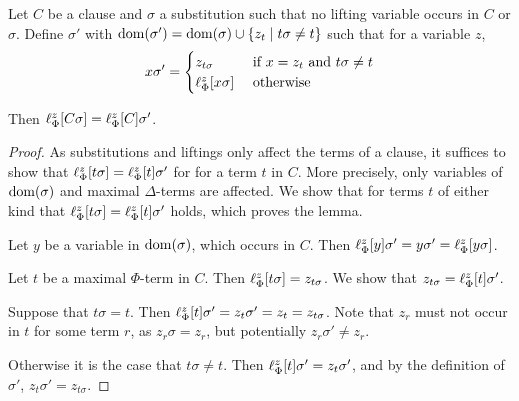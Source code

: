 \begin{lemma}
	\label{lemma:lif}
	Let $C$ be a clause and $\sigma$ a substitution such that no lifting variable occurs in $C$ or $\sigma$.
	Define $\sigma'$ with $\operatorname{dom}(\sigma') = \operatorname{dom}(\sigma) \cup \{ z_t \mid t\sigma \neq t \}$ such that for a variable $z$, 
	\[
		x \sigma' =
		\begin{cases} 
			z_{t\sigma} & \text{ if } x = z_t \text{ and } t\sigma \neq t \\
			\ell_{\Phi}^{z}[x\sigma] & \text{ otherwise}
		\end{cases} 
	\]

	Then
	$\ell_{\Phi}^{z}[C\sigma] =
	\ell_{\Phi}^{z}[C]\sigma'$.
\end{lemma}
\begin{proof}
	As substitutions and liftings only affect the terms of a clause, it suffices to  show that 
	$\ell_{\Phi}^{z}[t\sigma] = \ell_{\Phi}^{z}[t]\sigma'$ for for a term $t$ in $C$.
	More precisely, only variables of $\operatorname{dom}(\sigma)$ and maximal $\Delta$-terms are affected. 
	We show that for terms $t$ of either kind that
	$ \ell_{\Phi}^{z}[ t \sigma ] = \ell_{\Phi}^{z}[ t ] \sigma'$ holds, which proves the lemma.

	Let $y$ be a variable in $\operatorname{dom}(\sigma)$, which occurs in $C$. Then $\ell_{\Phi}^{z}[y]\sigma' = y\sigma' = \ell_{\Phi}^{z}[y\sigma]$.

	Let $t$ be a maximal $\Phi$-term in $C$.
	Then $\ell_{\Phi}^{z}[ t\sigma] = z_{t\sigma}$.
	We show that $z_{t\sigma} = \ell_{\Phi}^{z}[t]\sigma'$.

	Suppose that $t\sigma = t$. Then $\ell_{\Phi}^{z}[t]\sigma' = z_t\sigma' = z_t = z_{t\sigma}$.
	Note that $z_r$ must not occur in $t$ for some term $r$, as $z_r\sigma = z_r$, but potentially $z_r\sigma' \neq z_r$.

	Otherwise it is the case that $t\sigma \neq t$.
	Then $\ell_{\Phi}^{z}[t]\sigma' = z_t\sigma'$, and by the definition of $\sigma'$, $z_t\sigma' = z_{t\sigma}$.
\end{proof}




